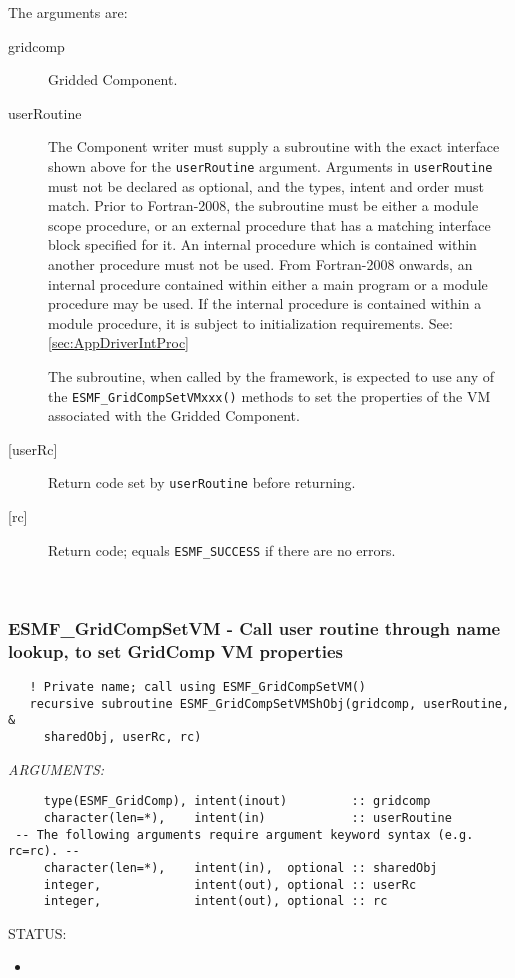    The arguments are:
   \begin{description}
   \item[gridcomp]
     Gridded Component.
   \item[userRoutine]
     The Component writer must supply a subroutine with the exact interface
     shown above for the {\tt userRoutine} argument. Arguments in {\tt userRoutine}
     must not be declared as optional, and the types, intent and order must match.
     Prior to Fortran-2008, the subroutine must be either a module scope procedure,
     or an external procedure that has a matching interface block specified for it.
     An internal procedure which is contained within another procedure must not be used.
     From Fortran-2008 onwards, an internal procedure contained within either a main program
     or a module procedure may be used.  If the internal procedure is contained within a
     module procedure, it is subject to initialization requirements.  See: \ref{sec:AppDriverIntProc}
  
     The subroutine, when called by the framework, is expected to use any of the
     {\tt ESMF\_GridCompSetVMxxx()} methods to set the properties of the VM
     associated with the Gridded Component.
   \item[{[userRc]}]
     Return code set by {\tt userRoutine} before returning.
   \item[{[rc]}]
     Return code; equals {\tt ESMF\_SUCCESS} if there are no errors.
   \end{description}
   
 
\mbox{}\hrulefill\ 
 
\subsubsection [ESMF\_GridCompSetVM] {ESMF\_GridCompSetVM - Call user routine through name lookup, to set GridComp VM properties}


  
\begin{verbatim}   ! Private name; call using ESMF_GridCompSetVM()
   recursive subroutine ESMF_GridCompSetVMShObj(gridcomp, userRoutine, &
     sharedObj, userRc, rc)\end{verbatim}{\em ARGUMENTS:}
\begin{verbatim}     type(ESMF_GridComp), intent(inout)         :: gridcomp
     character(len=*),    intent(in)            :: userRoutine
 -- The following arguments require argument keyword syntax (e.g. rc=rc). --
     character(len=*),    intent(in),  optional :: sharedObj
     integer,             intent(out), optional :: userRc
     integer,             intent(out), optional :: rc\end{verbatim}
{\sf STATUS:}
   \begin{itemize}
   \item{}
   \end{itemize}
  
